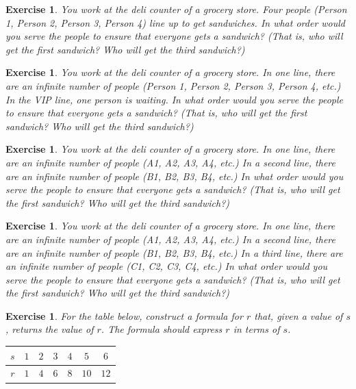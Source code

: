 \documentclass{book}
\newcounter{ekcounter}%
\theoremstyle{ekimcustom}
\newtheorem{exercise}[ekcounter]{Exercise}
\begin{document}
\begin{exercise}
You work at the deli counter of a grocery store.
Four people (Person 1, Person 2, Person 3, Person 4) line up to get sandwiches.
In what order would you serve the people to ensure that everyone gets a sandwich? (That is, who will get the first sandwich? Who will get the third sandwich?)
\end{exercise}

\begin{exercise}
You work at the deli counter of a grocery store.
In one line, there are an infinite number of people (Person 1, Person 2, Person 3, Person 4, etc.)
In the VIP line, one person is waiting.
In what order would you serve the people to ensure that everyone gets a sandwich? (That is, who will get the first sandwich? Who will get the third sandwich?)
\end{exercise}

\begin{exercise}
You work at the deli counter of a grocery store.
In one line, there are an infinite number of people (A1, A2, A3, A4, etc.)
In a second line, there are an infinite number of people (B1, B2, B3, B4, etc.)
In what order would you serve the people to ensure that everyone gets a sandwich? (That is, who will get the first sandwich? Who will get the third sandwich?)
\end{exercise}

\begin{exercise}
You work at the deli counter of a grocery store.
In one line, there are an infinite number of people (A1, A2, A3, A4, etc.)
In a second line, there are an infinite number of people (B1, B2, B3, B4, etc.)
In a third line, there are an infinite number of people (C1, C2, C3, C4, etc.)
In what order would you serve the people to ensure that everyone gets a sandwich? (That is, who will get the first sandwich? Who will get the third sandwich?)
\end{exercise}

\begin{exercise}
For the table below, construct a formula for $r$ that, given a value of $s$, returns the value of $r$. The formula should express $r$ in terms of $s$.
\vskip1pt
\begin{tabular}{c||c|c|c|c|c|c}
$s$ & $1$ & $2$ & $3$ & $4$ & $5$ & $6$ \\ \hline
$r$ & $1$ & $4$ & $6$ & $8$ & $10$ & $12$ \\ 
\end{tabular}
\end{exercise}
\end{document}

